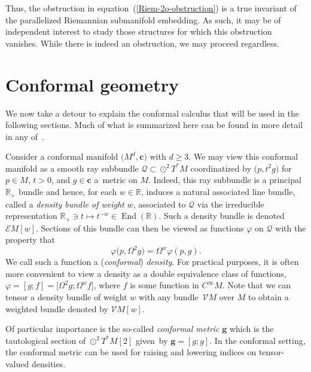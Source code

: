 \documentclass[11pt]{article}
\numberwithin{equation}{section}
\newcommand{\ce}{\mathcal{E}}
\newcommand{\cc}{\boldsymbol{c}}
\newcommand{\bg}{\boldsymbol{g}}
\renewcommand{\=}{\stackrel \Lambda =}
\begin{document}
Thus, the obstruction in equation~(\ref{Riem-2o-obstruction}) is a true invariant of the parallelized Riemannian submanifold embedding. As such, it may be of independent interest to study those structures for which this obstruction vanishes. While there is indeed an obstruction, we may proceed regardless.




\section{Conformal geometry}\label{conf-geom-sec}
We now take a detour to explain the conformal calculus that will be used in the following sections. Much of what is summarized here can be found in more detail in any of~\cite{BEG,CapGover1999,CapGover2003,GOpet,GW}.

Consider a conformal manifold $\bigl(M^d,\cc\bigr)$ with $d \geq 3$. We may view this conformal manifold as a smooth ray subbundle $\mathcal{Q} \subset \odot^2 T^* M$ coordinatized by $\bigl(p,t^2 g\bigr)$ for $p \in M$, $t > 0$, and $g \in \cc$ a~metric on $M$. Indeed, this ray subbundle is a principal $\mathbb{R}_+$ bundle and hence, for each $w \in \mathbb{R}$, induces a natural associated line bundle, called a \textit{density bundle of weight $w$}, associated to $\mathcal{Q}$ via the irreducible representation $\mathbb{R}_+ \ni t \mapsto t^{-w} \in \operatorname{End}(\mathbb{R})$. Such a density bundle is denoted~$\ce M[w]$. Sections of this bundle can then be viewed as functions $\varphi$ on $\mathcal{Q}$ with the property that
\[\varphi\bigl(p, \Omega^2 g\bigr) = \Omega^w \varphi(p,g) .\]
We call such a function a (\textit{conformal}) \textit{density}. For practical purposes, it is often more convenient to view a density as a double equivalence class of functions, $\varphi = [g;f] = \bigl[\Omega^2 g; \Omega^w f\bigr]$, where $f$ is some function in $C^\infty M$. Note that we can tensor a density bundle of weight $w$ with any bundle~$\mathcal{V} M$ over $M$ to obtain a weighted bundle denoted by $\mathcal{V} M[w]$.

Of particular importance is the so-called \textit{conformal metric} $\bg$ which is the tautological section of $\odot^2 T^* M[2]$ given~by $\bg = [g;g]$. In the conformal setting, the conformal metric can be used for raising and lowering indices on tensor-valued densities.
\end{document}
